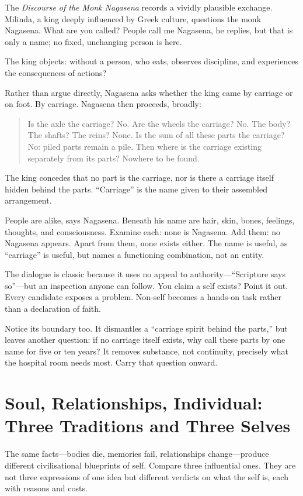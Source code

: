 The \textit{Discourse of the Monk Nagasena} records a vividly plausible exchange. Milinda, a king deeply influenced by Greek culture, questions the monk Nagasena. What are you called? People call me Nagasena, he replies, but that is only a name; no fixed, unchanging person is here.

The king objects: without a person, who eats, observes discipline, and experiences the consequences of actions?

Rather than argue directly, Nagasena asks whether the king came by carriage or on foot. By carriage. Nagasena then proceeds, broadly:

\begin{quote}
Is the axle the carriage? No. Are the wheels the carriage? No. The body? The shafts? The reins? None. Is the sum of all these parts the carriage? No: piled parts remain a pile. Then where is the carriage existing separately from its parts? Nowhere to be found.
\end{quote}
The king concedes that no part is the carriage, nor is there a carriage itself hidden behind the parts. ``Carriage'' is the name given to their assembled arrangement.

People are alike, says Nagasena. Beneath his name are hair, skin, bones, feelings, thoughts, and consciousness. Examine each: none is Nagasena. Add them: no Nagasena appears. Apart from them, none exists either. The name is useful, as ``carriage'' is useful, but names a functioning combination, not an entity.

The dialogue is classic because it uses no appeal to authority---``Scripture says so''---but an inspection anyone can follow. You claim a self exists? Point it out. Every candidate exposes a problem. Non-self becomes a hands-on task rather than a declaration of faith.

Notice its boundary too. It dismantles a ``carriage spirit behind the parts,'' but leaves another question: if no carriage itself exists, why call these parts by one name for five or ten years? It removes substance, not continuity, precisely what the hospital room needs most. Carry that question onward.

\section[Soul, Relationships, Individual]{Soul, Relationships, Individual: Three Traditions and Three Selves}
The same facts---bodies die, memories fail, relationships change---produce different civilisational blueprints of self. Compare three influential ones. They are not three expressions of one idea but different verdicts on what the self is, each with reasons and costs.

